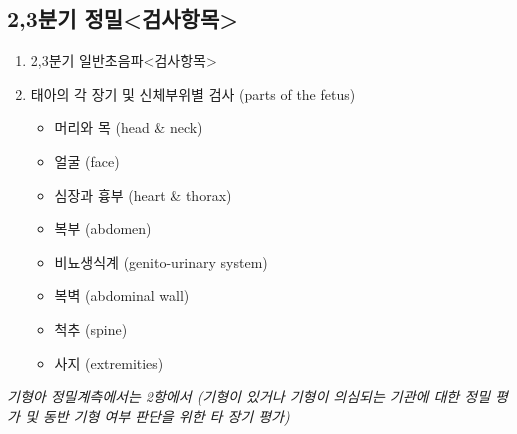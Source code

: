 \subsection{2,3분기 정밀<검사항목>}
\begin{enumerate}[①]\tightlist
\item 2,3분기 일반초음파<검사항목>
\item 태아의 각 장기 및 신체부위별 검사 (parts of the fetus)
	\begin{itemize}[-]\tightlist
	\item 머리와 목 (head \& neck)
	\item 얼굴 (face)
	\item 심장과 흉부 (heart \& thorax)
	\item 복부 (abdomen)
	\item 비뇨생식계 (genito-urinary system)
	\item 복벽 (abdominal wall)
	\item 척추 (spine)
	\item 사지 (extremities)
	\end{itemize}
\end{enumerate}
\emph{기형아 정밀계측에서는 2항에서 (기형이 있거나 기형이 의심되는 기관에 대한 정밀 평가 및 동반 기형 여부 판단을 위한 타 장기 평가)}

